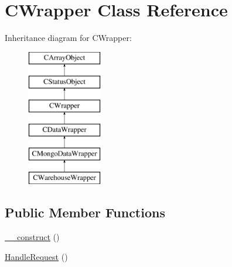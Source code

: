 \hypertarget{class_c_wrapper}{\section{C\-Wrapper Class Reference}
\label{class_c_wrapper}
}
Inheritance diagram for C\-Wrapper\-:\begin{figure}[H]
\begin{center}
\leavevmode
\includegraphics[height=6.000000cm]{class_c_wrapper}
\end{center}
\end{figure}
\subsection*{Public Member Functions}
\begin{DoxyCompactItemize}
\item 
\hyperlink{class_c_wrapper_a683094b01e0682fd34926562d7a052e0}{\-\_\-\-\_\-construct} ()
\item 
\hyperlink{class_c_wrapper_a0e605ca2cdd718ecdeb6f3be9b1f0162}{Handle\-Request} ()
\end{DoxyCompactItemize}
